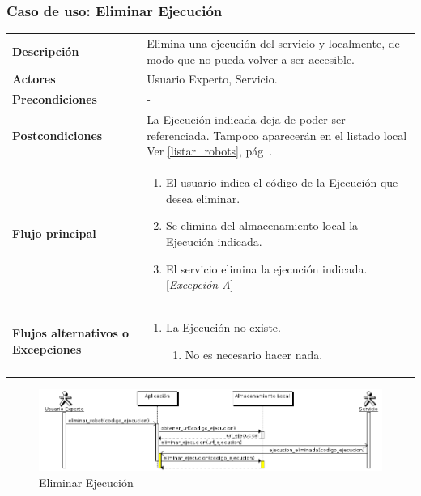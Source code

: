 \subsubsection{\large{Caso de uso: Eliminar Ejecución}}

\begin{tabular}[h]{ p{ } p{ }}

\textbf{Descripción} &  Elimina una ejecución del servicio y
localmente, de modo que no pueda volver a ser accesible. \\[3mm]

\textbf{Actores} & Usuario Experto, Servicio.\\[3mm]

\textbf{Precondiciones} & - \\[3mm]

\textbf{Postcondiciones} & La Ejecución indicada deja de poder ser
referenciada. Tampoco aparecerán en el listado local Ver
\ref{listar_robots}, pág~\pageref{listar_robots}. \\[3mm]

\textbf{Flujo principal} & \begin{enumerate}[leftmargin=1em,topsep=0pt, partopsep=0pt]
  \item El usuario indica el código de la Ejecución que desea
    eliminar.
  \item Se elimina del almacenamiento local la Ejecución indicada.
  \item El servicio elimina la ejecución indicada. [\emph{Excepción A}]
\end{enumerate}\\[3mm]

\textbf{Flujos alternativos o Excepciones} &
\begin{enumerate}[label=\Alph*:,leftmargin=1em,topsep=0pt, partopsep=0pt]
\item La Ejecución no existe.
  \begin{enumerate}[label=\arabic*.,topsep=0pt, partopsep=0pt]
    \item No es necesario hacer nada.
  \end{enumerate}
\end{enumerate}\\[3mm]
\end{tabular}

\begin{figure}[bp!]
  \includegraphics[width=1\textwidth]{chapters/technical-manual/diagrams/sequence/expert_user/eliminar_ejecucion.png}
\caption{Eliminar Ejecución}
\end{figure}
\clearpage
